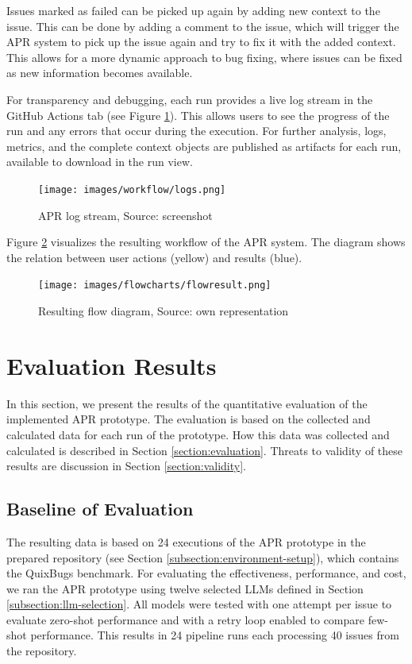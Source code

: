 Issues marked as failed can be picked up again by adding new context to the issue. This can be done by adding a comment to the issue, which will trigger the APR system to pick up the issue again and try to fix it with the added context. This allows for a more dynamic approach to bug fixing, where issues can be fixed as new information becomes available.


For transparency and debugging, each run provides a live log stream in the GitHub Actions tab (see Figure \ref{fig:log-stream}). This allows users to see the progress of the run and any errors that occur during the execution. For further analysis, logs, metrics, and the complete context objects are published as artifacts for each run, available to download in the run view.
\begin{figure}[H]
    \centering
    \texttt{[image: images/workflow/logs.png]}
    \caption{APR log stream, Source: screenshot}
    \label{fig:log-stream}
\end{figure}

Figure \ref{fig:flow} visualizes the resulting workflow of the APR system. The diagram shows the relation between user actions (yellow) and results (blue).

\begin{figure}[H]
    \centering
    \texttt{[image: images/flowcharts/flowresult.png]}
    \caption{Resulting flow diagram, Source: own representation}
    \label{fig:flow}
\end{figure}

\section{Evaluation Results} \label{section:evaluation-results}

In this section, we present the results of the quantitative evaluation of the implemented APR prototype. The evaluation is based on the collected and calculated data for each run of the prototype. How this data was collected and calculated is described in Section \ref{section:evaluation}. Threats to validity of these results are discussion in Section \ref{section:validity}.

\subsection{Baseline of Evaluation}

The resulting data is based on 24 executions of the APR prototype in the prepared repository (see Section \ref{subsection:environment-setup}), which contains the QuixBugs benchmark. For evaluating the effectiveness, performance, and cost, we ran the APR prototype using twelve selected \acp{LLM} defined in Section \ref{subsection:llm-selection}. All models were tested with one attempt per issue to evaluate zero-shot performance and with a retry loop enabled to compare few-shot performance. This results in 24 pipeline runs each processing 40 issues from the repository.

